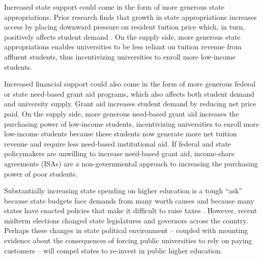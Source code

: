 \documentclass[twoside]{article}
\begin{document}
Increased state support could come in the form of more generous state appropriations.  Prior research finds that growth in state appropriations increases access by placing downward pressure on resident tuition price \citep{RN2609} which, in turn, positively affects student demand \citep{RN3068}.  On the supply side, more generous state appropriations enables universities to be less reliant on tuition revenue from affluent students, thus incentivizing universities to enroll more low-income students.

Increased financial support could also come in the form of more generous federal or state need-based grant aid programs, which also affects both student demand and university supply. Grant aid increases student demand by reducing net price paid.  On the supply side, more generous need-based grant aid increases the purchasing power of low-income students, incentivizing universities to enroll more low-income students because these students now generate more net tuition revenue and require less need-based institutional aid. If federal and state policymakers are unwilling to increase need-based grant aid, income-share agreements (ISAs) are a non-governmental approach to increasing the purchasing power of poor students.

Substantially increasing state spending on higher education is a tough ``ask'' because state budgets face demands from many worth causes \citep{RN1652} and because many states have enacted policies that make it difficult to raise taxes \citep{RN1646}.  However, recent midterm elections changed state legislatures and governors across the country.  Perhaps these changes in state political environment -- coupled with mounting evidence about the consequences of forcing public universities to rely on paying customers -- will compel states to re-invest in public higher education.
\end{document}

